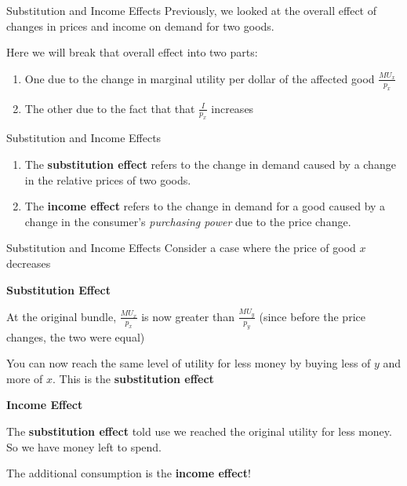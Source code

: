 \documentclass[12pt,t]{beamer}
\begin{document}
\begin{frame}{Substitution and Income Effects}
  Previously, we looked at the overall effect of changes in prices and income on demand for two goods.

  Here we will break that overall effect into two parts:

  \begin{enumerate}
    \item One due to the change in marginal utility per dollar of the affected good $\frac{MU_x}{p_x}$ 
    
    \item The other due to the fact that that $\frac{I}{p_x}$ increases
  \end{enumerate}
  
\end{frame}

\begin{frame}{Substitution and Income Effects}
  \begin{enumerate}
    \item The \textbf{substitution effect} refers to the change in demand caused by a change in the relative prices of two goods.

    \item The \textbf{income effect} refers to the change in demand for a good caused by a change in the consumer's  \textit{purchasing power} due to the price change.
  \end{enumerate}
\end{frame}

\begin{frame}{Substitution and Income Effects}
  Consider a case where the price of good $x$ decreases
  
  \bigskip
  \textbf{Substitution Effect}
  
  At the original bundle, $\frac{MU_x}{p_x}$ is now greater than $\frac{MU_y}{p_y}$ (since before the price changes, the two were equal)

  \smallskip
  You can now reach the same level of utility for less money by buying less of $y$ and more of $x$. This is the \textbf{substitution effect}

  \bigskip
  \textbf{Income Effect}
  
  The \textbf{substitution effect} told use we reached the original utility for less money. So we have money left to spend. 
  
  \smallskip
  The additional consumption is the \textbf{income effect}!
\end{frame}
\end{document}
